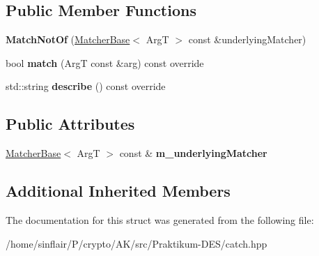 \subsection*{Public Member Functions}
\begin{DoxyCompactItemize}
\item 
\mbox{\label{structCatch_1_1Matchers_1_1Impl_1_1MatchNotOf_a47afdd9e4c3354cef85adc3186097ae4}} 
{\bfseries Match\+Not\+Of} (\hyperlink{structCatch_1_1Matchers_1_1Impl_1_1MatcherBase}{Matcher\+Base}$<$ ArgT $>$ const \&underlying\+Matcher)
\item 
\mbox{\label{structCatch_1_1Matchers_1_1Impl_1_1MatchNotOf_a181d693c0258e582d80dc6117a1f2b66}} 
bool {\bfseries match} (ArgT const \&arg) const override
\item 
\mbox{\label{structCatch_1_1Matchers_1_1Impl_1_1MatchNotOf_ac5fb4ef6a9069d23a4098c3c818f06b0}} 
std\+::string {\bfseries describe} () const override
\end{DoxyCompactItemize}
\subsection*{Public Attributes}
\begin{DoxyCompactItemize}
\item 
\mbox{\label{structCatch_1_1Matchers_1_1Impl_1_1MatchNotOf_af7ac67f112b0e93796b048a47329aad4}} 
\hyperlink{structCatch_1_1Matchers_1_1Impl_1_1MatcherBase}{Matcher\+Base}$<$ ArgT $>$ const  \& {\bfseries m\+\_\+underlying\+Matcher}
\end{DoxyCompactItemize}
\subsection*{Additional Inherited Members}


The documentation for this struct was generated from the following file\+:\begin{DoxyCompactItemize}
\item 
/home/sinflair/\+P/crypto/\+A\+K/src/\+Praktikum-\/\+D\+E\+S/catch.\+hpp\end{DoxyCompactItemize}
